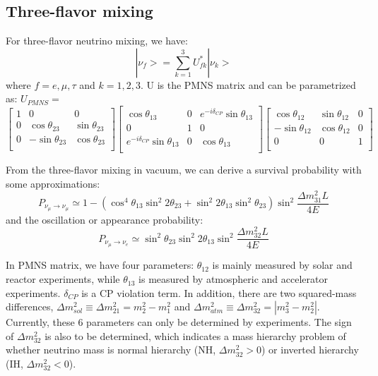 \documentclass[preprint,12pt]{elsarticle}
\numberwithin{equation}{section}
\begin{document}
\subsection{Three-flavor mixing}
For three-flavor neutrino mixing, we have:
\begin{equation}\label{eq:mixingmatrix}
|\nu_f> = \sum_{k=1}^3U^*_{fk}|\nu_k> 
\end{equation}
where $f=e,\mu,\tau$ and $k=1,2,3$. U is the PMNS matrix and can be parametrized as: 
$U_{PMNS} = $
\begin{equation}
\begin{bmatrix}
1 &0 &0\\
0 &\cos\theta_{23} &\sin\theta_{23}\\
0 &-\sin\theta_{23} &\cos\theta_{23}\\ 
\end{bmatrix}
\begin{bmatrix}
\cos\theta_{13} &0 &e^{-i\delta_{CP}}\sin\theta_{13}\\
0 &1 &0\\
e^{-i\delta_{CP}}\sin\theta_{13} &0 &\cos\theta_{13}\\ 
\end{bmatrix}
\begin{bmatrix}
\cos\theta_{12} &\sin\theta_{12} &0\\
-\sin\theta_{12} &\cos\theta_{12} &0\\
0 &0 &1\\ 
\end{bmatrix}
\end{equation}

From the three-flavor mixing in vacuum, we can derive a survival probability with some approximations:
\begin{equation}\label{eq:disappear}
P_{\nu_\mu\to\nu_\mu}\simeq 1-(\cos^4\theta_{13}\sin^2 2\theta_{23}+\sin^2 2\theta_{13}\sin^2\theta_{23})\sin^2\frac{\Delta m^2_{31}L}{4E}
\end{equation}
and the oscillation or appearance probability\cite{nakaya}:
\begin{equation}\label{eq:appear}
P_{\nu_\mu\to\nu_e}\simeq \sin^2 \theta_{23}\sin^2 2\theta_{13}\sin^2 \frac{\Delta m^2_{32}L}{4E}
\end{equation}

In PMNS matrix, we have four parameters: $\theta_{12}$ is mainly measured by solar and reactor experiments, while $\theta_{13}$ is measured by atmospheric and accelerator experiments. $\delta_{CP}$ is a CP violation term. In addition, there are two squared-mass differences, $\Delta m^2_{sol}\equiv\Delta m^2_{21}=m_2^2-m_1^2$ and $\Delta m^2_{atm}\equiv\Delta m^2_{32}=|m_3^2-m_2^2|$. Currently, these 6 parameters can only be determined by experiments. The sign of $\Delta m^2_{32}$ is also to be determined, which indicates a mass hierarchy problem of whether neutrino mass is normal hierarchy (NH, $\Delta m^2_{32}>0$) or inverted hierarchy (IH, $\Delta m^2_{32}<0$).
\end{document}
